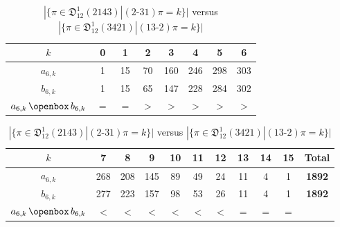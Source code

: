 \documentclass[
final
]{dmtcs-episciences}
\theoremstyle{definition}
\theoremstyle{remark}
\begin{document}
\begin{table}[!h]
\begin{flushleft}
\begin{tabular}{c||c|c|c|c|c|c|c}
	$k$  &0 & 1 & 2 & 3 & 4 & 5 & 6 \\
	\hline 
	$a_{6,k}$ & 1 & 15 & 70 & 160 & 246 & 298 & 303\\
	\hline
	$b_{6,k}$ & 1 & 15 & 65 & 147 & 228 & 284 & 302 \\
	\hline
	$a_{6,k} \, \openbox \, b_{6,k}$ & $=$ & $=$ & $>$ & $>$ & $>$ & $>$ & $>$
\end{tabular}
\end{flushleft}
%
\begin{flushright}
\begin{tabular}{c||c|c|c|c|c|c|c|c|c||c}
	$k$ &7 & 8 &9 &10 &11 &12 &13 &14 &15 & \textbf{Total}\\
	\hline 
	$a_{6,k}$ &268 & 208 & 145 & 89 & 49 & 24 & 11 & 4 & 1 & \textbf{1892}\\
	\hline
	$b_{6,k}$ &277 & 223 & 157 & 98 & 53 & 26 & 11 & 4 & 1 & \textbf{1892}\\
	\hline
	$a_{6,k} \, \openbox \, b_{6,k}$ & $<$ & $<$ & $<$ & $<$ & $<$ & $<$ & $=$ & $=$ & $=$
\end{tabular}
\end{flushright}
\caption{$|\{\pi \in \mathfrak{D}^1_{12} (2143) | (2\text{-}31)\pi = k\}|$ versus $|\{\pi \in \mathfrak{D}^1_{12} (3421) | (13\text{-}2)\pi = k\}|$}
\label{table:cum_dist2}
\end{table}
\end{document}
